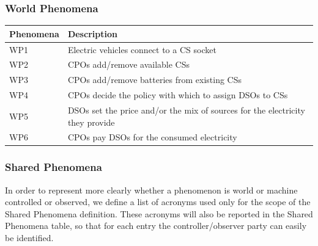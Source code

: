 \documentclass[11pt]{article}
\begin{document}
\subsubsection{World Phenomena}

\begin{table}[H]
    \centering
    \setlength{\tabcolsep}{18pt}
    \renewcommand{\arraystretch}{1.2}
    \begin{tabularx}{\textwidth}{|>{\centering\hsize=0.3\hsize}X|>{\hsize=1.7\hsize}X|}
        \hline
        \textbf{Phenomena} & \textbf{Description} \\
        \hline
        WP1 & Electric vehicles connect to a CS socket \\
        \hline
        WP2 & CPOs add/remove available CSs \\
        \hline
        WP3 & CPOs add/remove batteries from existing CSs \\
        \hline
        WP4 & CPOs decide the policy with which to assign DSOs to CSs \\
        \hline
        WP5 & DSOs set the price and/or the mix of sources for the electricity they provide \\
        \hline
        WP6 & CPOs pay DSOs for the consumed electricity \\
        \hline
    \end{tabularx}
    \label{tab:world_phenomena}
\end{table}

\subsubsection{Shared Phenomena}

In order to represent more clearly whether a phenomenon is world or machine controlled or observed, we define a list of acronyms used only for the scope of the Shared Phenomena definition. These acronyms will also be reported in the Shared Phenomena table, so that for each entry the controller/observer party can easily be identified. 
\end{document}
